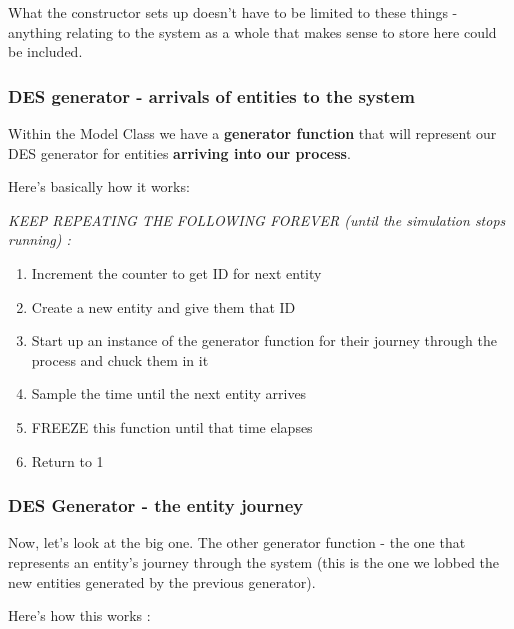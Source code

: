 \documentclass[
  letterpaper,
  DIV=11,
  numbers=noendperiod]{scrreprt}
\providecommand{\tightlist}{%
  \setlength{\itemsep}{0pt}\setlength{\parskip}{0pt}}\usepackage{longtable,booktabs,array}
\begin{document}
What the constructor sets up doesn't have to be limited to these things
- anything relating to the system as a whole that makes sense to store
here could be included.

\subsubsection{DES generator - arrivals of entities to the
system}\label{des-generator---arrivals-of-entities-to-the-system}

Within the Model Class we have a \textbf{generator function} that will
represent our DES generator for entities \textbf{arriving into our
process}.

Here's basically how it works:

\emph{KEEP REPEATING THE FOLLOWING FOREVER (until the simulation stops
running) :}

\begin{enumerate}
\def\labelenumi{\arabic{enumi}.}
\tightlist
\item
  Increment the counter to get ID for next entity
\item
  Create a new entity and give them that ID
\item
  Start up an instance of the generator function for their journey
  through the process and chuck them in it
\item
  Sample the time until the next entity arrives
\item
  FREEZE this function until that time elapses
\item
  Return to 1
\end{enumerate}

\subsubsection{DES Generator - the entity
journey}\label{des-generator---the-entity-journey}

Now, let's look at the big one. The other generator function - the one
that represents an entity's journey through the system (this is the one
we lobbed the new entities generated by the previous generator).

Here's how this works :
\end{document}
